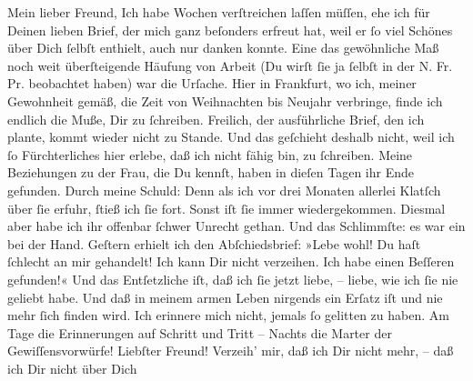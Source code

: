 \begin{ledgroupsized}[t]{13cm}
           \pstart{}Mein lieber Freund,\pend\pstart
           Ich habe Wochen verſtreichen laſſen müſſen, ehe ich für Deinen lieben Brief, der mich
               ganz beſonders erfreut hat, weil er ſo viel Schönes über Dich ſelbſt enthielt, auch
               nur danken konnte. Eine das gewöhnliche Maß noch weit überſteigende Häufung von
               Arbeit (Du wirſt ſie ja ſelbſt in der N. Fr. Pr.
               beobachtet haben) war die Urſache. Hier in Frankfurt, wo ich, meiner Gewohnheit gemäß, die Zeit von Weihnachten bis Neujahr
               verbringe, finde ich endlich die {\pb}Muße, Dir zu
               ſchreiben. Freilich, der ausführliche Brief, den ich plante, kommt wieder nicht zu
               Stande. Und das geſchieht deshalb nicht, weil ich ſo Fürchterliches hier erlebe, daß
               ich nicht fähig bin, zu ſchreiben. Meine Beziehungen zu der Frau, die Du kennſt, haben in dieſen Tagen
               ihr Ende gefunden. Durch meine Schuld: Denn als ich vor drei Monaten allerlei Klatſch
               über ſie erfuhr, ſtieß ich ſie fort. Sonst iſt ſie immer wiedergekommen. Diesmal aber
               habe ich ihr offenbar ſchwer Unrecht gethan. Und das Schlimmſte: es war ein \label{K_L03231-1v}\label{K_L03231-1h} bei der Hand.
                  Geſtern erhielt ich den Abſchiedsbrief: »Lebe wohl!
               Du haſt ſchlecht an mir gehandelt! Ich kann Dir nicht verzeihen. Ich habe einen Beſſeren gefunden!«\pend
           \pstart
           Und das Entſetzliche iſt, daß ich ſie jetzt liebe, – liebe, wie ich ſie nie geliebt
               habe. Und daß in meinem armen Leben nirgends ein Erſatz iſt und nie mehr ſich finden
               wird. Ich erinnere mich nicht, jemals ſo gelitten zu haben. Am Tage die Erinnerungen
               auf Schritt und Tritt – Nachts die Marter {\pb}der
               Gewiſſensvorwürfe!\pend
           \pstart
           Liebſter Freund! Verzeih’ mir, daß ich Dir nicht mehr, – daß ich Dir nicht über Dich

\end{ledgroupsized}
